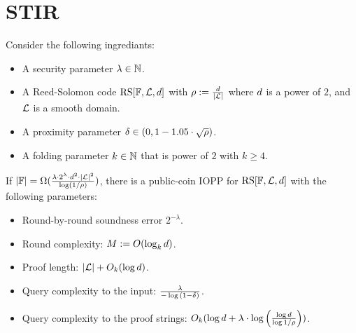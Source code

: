 \section{STIR}
\begin{theorem}\label{thm:stir}
    Consider the following ingrediants:
    \begin{itemize}
        \item A security parameter $\lambda\in\mathbb{N}$.
        \item A Reed-Solomon code $\mathrm{RS}[\mathbb{F},\mathcal{L},d]$ with $\rho:=\frac{d}{|\mathcal{L}|}$ where $d$ is a power of $2$, and $\mathcal{L}$ is a smooth domain.
        \item A proximity parameter $\delta\in(0,1-1.05\cdot\sqrt{\rho})$.
        \item A folding parameter $k\in\mathbb{N}$ that is power of $2$ with $k\geq 4$.
    \end{itemize}
If $|\mathbb{F}|=\Omega(\frac{\lambda\cdot2^\lambda\cdot d^2\cdot{|\mathcal{L}|}^2}{\log(1/\rho)})$, there is a public-coin IOPP for $\mathrm{RS}[\mathbb{F},\mathcal{L},d]$ with the following parameters:
\begin{itemize}
    \item Round-by-round soundness error $2^{-\lambda}$.
    \item Round complexity: $M:=O(\log_k{d})$.
    \item Proof length: $|\mathcal{L}|+O_k(\log{d})$.
    \item Query complexity to the input: $\frac{\lambda}{-\log{(1-\delta)}}$.
    \item Query complexity to the proof strings: $O_k(\log{d}+\lambda\cdot\log{\Big(\frac{\log{d}}{\log{1/\rho}}\Big)})$.
\end{itemize}
\end{theorem}

